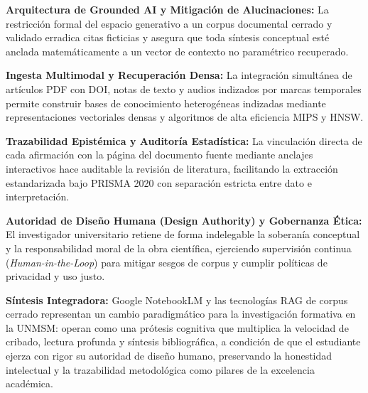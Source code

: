 \begin{resumenlist}[topsep=0.08cm, itemsep=0.08cm, parsep=0pt]
    \item \textbf{Arquitectura de Grounded AI y Mitigación de Alucinaciones:} La restricción formal del espacio generativo a un corpus documental cerrado y validado erradica citas ficticias y asegura que toda síntesis conceptual esté anclada matemáticamente a un vector de contexto no paramétrico recuperado.
    \item \textbf{Ingesta Multimodal y Recuperación Densa:} La integración simultánea de artículos PDF con DOI, notas de texto y audios indizados por marcas temporales permite construir bases de conocimiento heterogéneas indizadas mediante representaciones vectoriales densas y algoritmos de alta eficiencia MIPS y HNSW.
    \item \textbf{Trazabilidad Epistémica y Auditoría Estadística:} La vinculación directa de cada afirmación con la página del documento fuente mediante anclajes interactivos hace auditable la revisión de literatura, facilitando la extracción estandarizada bajo PRISMA 2020 con separación estricta entre dato e interpretación.
    \item \textbf{Autoridad de Diseño Humana (Design Authority) y Gobernanza Ética:} El investigador universitario retiene de forma indelegable la soberanía conceptual y la responsabilidad moral de la obra científica, ejerciendo supervisión continua (\textit{Human-in-the-Loop}) para mitigar sesgos de corpus y cumplir políticas de privacidad y uso justo.
\end{resumenlist}

\begin{cajabeige}
\textbf{Síntesis Integradora:} Google NotebookLM y las tecnologías RAG de corpus cerrado representan un cambio paradigmático para la investigación formativa en la UNMSM: operan como una prótesis cognitiva que multiplica la velocidad de cribado, lectura profunda y síntesis bibliográfica, a condición de que el estudiante ejerza con rigor su autoridad de diseño humano, preservando la honestidad intelectual y la trazabilidad metodológica como pilares de la excelencia académica.
\end{cajabeige}

\newpage
{}

